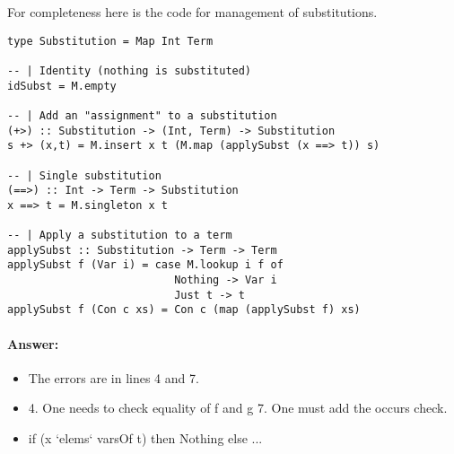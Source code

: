 \documentclass{article}
\newcommand{\answer}[0]{\paragraph{Answer:}}
\begin{document}
For completeness here is the code for management of substitutions.

\begin{verbatim}
type Substitution = Map Int Term

-- | Identity (nothing is substituted)
idSubst = M.empty

-- | Add an "assignment" to a substitution
(+>) :: Substitution -> (Int, Term) -> Substitution
s +> (x,t) = M.insert x t (M.map (applySubst (x ==> t)) s)

-- | Single substitution
(==>) :: Int -> Term -> Substitution
x ==> t = M.singleton x t

-- | Apply a substitution to a term
applySubst :: Substitution -> Term -> Term
applySubst f (Var i) = case M.lookup i f of
                          Nothing -> Var i
                          Just t -> t
applySubst f (Con c xs) = Con c (map (applySubst f) xs)
\end{verbatim}

\answer{
  \begin{itemize}
  \item The errors are in lines 4 and 7.
  \item 4. One needs to check equality of f and g
        7. One must add the occurs check.
  \item if (x `elems` varsOf t) then Nothing else ...
  \end{itemize}
}
\end{document}
